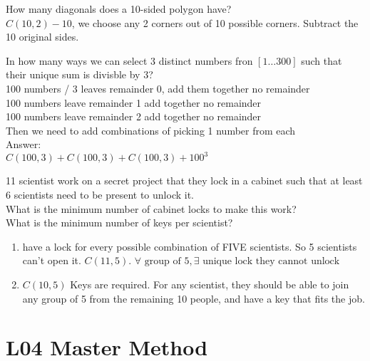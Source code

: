 \begin{itemize}
\begin{theorem}
		\end{theorem}
		\begin{example}
			How many diagonals does a 10-sided polygon have?\\
			$C(10,2) - 10$, we choose any 2 corners out of 10 possible corners. Subtract the 10 original sides.
		\end{example}
		\begin{example}
			In how many ways we can select 3 distinct numbers fron $[1\ldots 300]$ such that their unique sum is divisble by 3?\\
			100 numbers / 3 leaves remainder 0, add them together no remainder\\
			100 numbers leave remainder 1 add together no remainder\\
			100 numbers leave remainder 2 add together no remainder\\
			Then we need to add combinations of picking 1 number from each\\
			Answer:\\
			$C\left( 100, 3 \right)  + C\left( 100,3 \right) + C\left( 100,3 \right)  + 100^3$
		\end{example}
		\begin{example}
			11 scientist work on a secret project that they lock in a cabinet such that at least 6 scientists need to be present to unlock it.\\
			What is the minimum number of cabinet locks to make this work?\\
			What is the minimum number of keys per scientist?\\
			\begin{enumerate}
				\item have a lock for every possible combination of FIVE scientists. So 5 scientists can't open it. $C\left( 11, 5 \right) $. $\forall \text{ group of 5}, \exists \text{ unique lock they cannot unlock}$
				\item $C\left( 10, 5 \right) $ Keys are required. For any scientist, they should be able to join any group of 5 from the remaining 10 people, and have a key that fits the job.
			\end{enumerate}
		\end{example}
\end{itemize}

\section{L04 Master Method}

